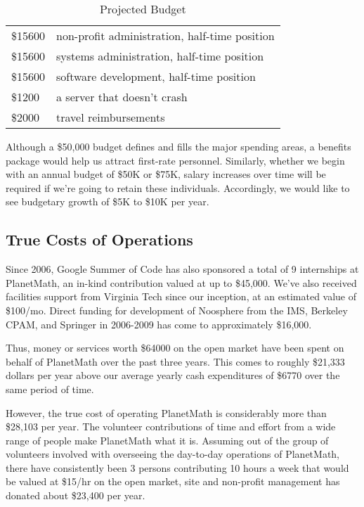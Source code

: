 \begin{table}
\begin{center}
\begin{tabular}{ll}
\$15600 & non-profit administration, half-time position \\
\$15600 & systems administration, half-time position \\
\$15600 & software development, half-time position \\
\$1200  & a server that doesn't crash \\
\$2000  & travel reimbursements \\
\end{tabular}
\end{center}
\caption{Projected Budget}
\end{table}

Although a \$50,000 budget defines and fills the major spending areas, a
benefits package would help us attract first-rate personnel. Similarly, whether
we begin with an annual budget of \$50K or \$75K, salary increases over time will
be required if we're going to retain these individuals. Accordingly, we would
like to see budgetary growth of \$5K to \$10K per year.

\subsection*{True Costs of Operations}
Since 2006, Google Summer of Code has also sponsored a total of 9 internships
at PlanetMath, an in-kind contribution valued at up to \$45,000. We've also
received facilities support from Virginia Tech since our inception, at an
estimated value of \$100/mo. Direct funding for development of Noosphere from
the IMS, Berkeley CPAM, and Springer in 2006-2009 has come to approximately
\$16,000.

Thus, money or services worth \$64000 on the open market have been spent on
behalf of PlanetMath over the past three years. This comes to roughly \$21,333
dollars per year above our average yearly cash expenditures of \$6770 over the
same period of time.

However, the true cost of operating PlanetMath is considerably more than
\$28,103 per year. The volunteer contributions of time and effort from a wide
range of people make PlanetMath what it is. Assuming out of the group of
volunteers involved with overseeing the day-to-day operations of PlanetMath,
there have consistently been 3 persons contributing 10 hours a week that would
be valued at \$15/hr on the open market, site and non-profit management has
donated about \$23,400 per year.

